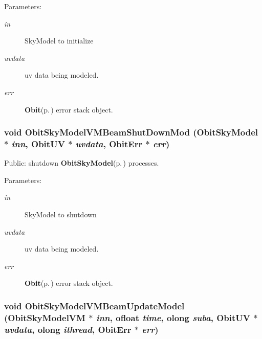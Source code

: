 \begin{Desc}
\item[Parameters:]
\begin{description}
\item[{\em in}]Sky\-Model to initialize \item[{\em uvdata}]uv data being modeled. \item[{\em err}]{\bf Obit}{\rm (p.\,\pageref{structObit})} error stack object. \end{description}
\end{Desc}
\subsubsection{\setlength{\rightskip}{0pt plus 5cm}void Obit\-Sky\-Model\-VMBeam\-Shut\-Down\-Mod ({\bf Obit\-Sky\-Model} $\ast$ {\em inn}, {\bf Obit\-UV} $\ast$ {\em uvdata}, {\bf Obit\-Err} $\ast$ {\em err})}\label{ObitSkyModelVMBeam_8h_a8}


Public: shutdown {\bf Obit\-Sky\-Model}{\rm (p.\,\pageref{structObitSkyModel})} processes. 

\begin{Desc}
\item[Parameters:]
\begin{description}
\item[{\em in}]Sky\-Model to shutdown \item[{\em uvdata}]uv data being modeled. \item[{\em err}]{\bf Obit}{\rm (p.\,\pageref{structObit})} error stack object. \end{description}
\end{Desc}
\subsubsection{\setlength{\rightskip}{0pt plus 5cm}void Obit\-Sky\-Model\-VMBeam\-Update\-Model ({\bf Obit\-Sky\-Model\-VM} $\ast$ {\em inn}, {\bf ofloat} {\em time}, {\bf olong} {\em suba}, {\bf Obit\-UV} $\ast$ {\em uvdata}, {\bf olong} {\em ithread}, {\bf Obit\-Err} $\ast$ {\em err})}\label{ObitSkyModelVMBeam_8h_a13}


